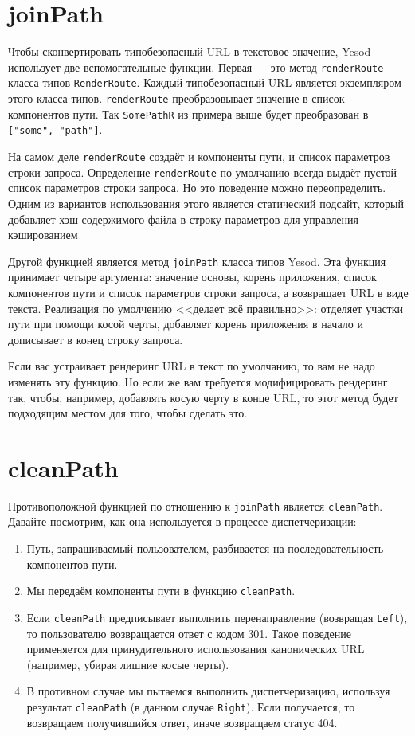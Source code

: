 \section {joinPath}

Чтобы сконвертировать типобезопасный URL в текстовое значение, Yesod использует две вспомогательные функции. Первая --- это метод \lstinline!renderRoute! класса типов \lstinline!RenderRoute!. Каждый типобезопасный URL является экземпляром этого класса типов. \lstinline!renderRoute! преобразовывает значение в список компонентов пути. Так \lstinline!SomePathR! из примера выше будет преобразован в \lstinline!["some", "path"]!.

\begin{remark}
На самом деле \lstinline!renderRoute! создаёт и компоненты пути, и список параметров строки запроса. Определение \lstinline!renderRoute! по умолчанию всегда выдаёт пустой список параметров строки запроса. Но это поведение можно переопределить. Одним из вариантов использования этого является статический подсайт, который добавляет хэш содержимого файла в строку параметров для управления кэшированием
\end{remark}

Другой функцией является метод \lstinline!joinPath! класса типов Yesod. Эта функция принимает четыре аргумента: значение основы, корень приложения, список компонентов пути и список параметров строки запроса, а возвращает URL в виде текста. Реализация по умолчению <<делает всё правильно>>: отделяет участки пути при помощи косой черты, добавляет корень приложения в начало и дописывает в конец строку запроса.

Если вас устраивает рендеринг URL в текст по умолчанию, то вам не надо изменять эту функцию. Но если же вам требуется модифицировать рендеринг так, чтобы, например, добавлять косую черту в конце URL, то этот метод будет подходящим местом для того, чтобы сделать это.

\section {cleanPath}

Противоположной функцией по отношению к \lstinline!joinPath! является \lstinline!cleanPath!. Давайте посмотрим, как она используется в процессе диспетчеризации:

\begin{enumerate}
  \item Путь, запрашиваемый пользователем, разбивается на последовательность компонентов пути.
  \item Мы передаём компоненты пути в функцию \lstinline!cleanPath!.
  \item Если \lstinline!cleanPath! предписывает выполнить перенаправление (возвращая \lstinline!Left!), то пользователю возвращается ответ с кодом 301. Такое поведение применяется для принудительного использования канонических URL (например, убирая лишние косые черты).
  \item В противном случае мы пытаемся выполнить диспетчеризацию, используя результат \lstinline!cleanPath! (в данном случае \lstinline!Right!). Если получается, то возвращаем получившийся ответ, иначе возвращаем статус 404.
\end{enumerate}

